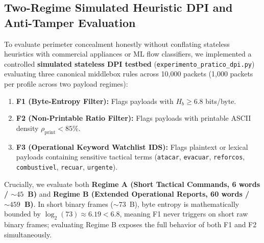\documentclass[conference]{IEEEtran}
\begin{document}
\subsection{Two-Regime Simulated Heuristic DPI and Anti-Tamper Evaluation}
To evaluate perimeter concealment honestly without conflating stateless heuristics with commercial appliances or ML flow classifiers, we implemented a controlled \textbf{simulated stateless DPI testbed} (\texttt{experimento\_pratico\_dpi.py}) evaluating three canonical middlebox rules across 10,000 packets (1,000 packets per profile across two payload regimes):
\begin{enumerate}
    \item \textbf{F1 (Byte-Entropy Filter):} Flags payloads with $H_b \ge 6.8$ bits/byte.
    \item \textbf{F2 (Non-Printable Ratio Filter):} Flags payloads with printable ASCII density $\rho_{\text{print}} < 85\%$.
    \item \textbf{F3 (Operational Keyword Watchlist IDS):} Flags plaintext or lexical payloads containing sensitive tactical terms (\texttt{atacar}, \texttt{evacuar}, \texttt{reforcos}, \texttt{combustivel}, \texttt{recuar}, \texttt{urgente}).
\end{enumerate}

Crucially, we evaluate both \textbf{Regime A (Short Tactical Commands, 6 words / $\sim 45$~B)} and \textbf{Regime B (Extended Operational Reports, 60 words / $\sim 459$~B)}. In short binary frames ($\sim 73$~B), byte entropy is mathematically bounded by $\log_2(73) \approx 6.19 < 6.8$, meaning F1 never triggers on short raw binary frames; evaluating Regime B exposes the full behavior of both F1 and F2 simultaneously.
\end{document}
